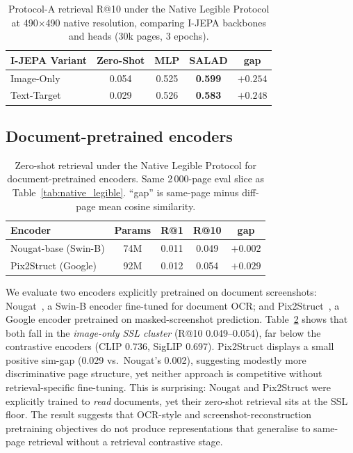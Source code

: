 \documentclass{article}
\begin{document}
\begin{table}[t]
\caption{Protocol-A retrieval R@10 under the Native Legible Protocol at 490$\times$490 native resolution, comparing I-JEPA backbones and heads (30k pages, 3 epochs).}
\label{tab:native_legible_ijepa}
\centering
\small
\begin{tabular}{lcccc}
\toprule
I-JEPA Variant & Zero-Shot & MLP & SALAD & gap \\
\midrule
\rowcolor{cSSL} Image-Only & 0.054 & 0.525 & \textbf{0.599} & $+0.254$ \\
\rowcolor{cSSL} Text-Target & 0.029 & 0.526 & \textbf{0.583} & $+0.248$ \\
\bottomrule
\end{tabular}
\end{table}

\subsection{Document-pretrained encoders}
\label{sec:doc_family}

\begin{table}[t]
\caption{Zero-shot retrieval under the Native Legible Protocol for document-pretrained encoders. Same 2\,000-page eval slice as Table~\ref{tab:native_legible}. ``gap'' is same-page minus diff-page mean cosine similarity.}
\label{tab:doc_family}
\centering
\small
\begin{tabular}{lcccc}
\toprule
Encoder & Params & R@1 & R@10 & gap \\
\midrule
\rowcolor{cSSL} Nougat-base (Swin-B) & 74M & 0.011 & 0.049 & $+0.002$ \\
\rowcolor{cSSL} Pix2Struct (Google)  & 92M & 0.012 & 0.054 & $+0.029$ \\
\bottomrule
\end{tabular}
\end{table}

We evaluate two encoders explicitly pretrained on document screenshots: Nougat~\cite{blecher2023nougat}, a Swin-B encoder fine-tuned for document OCR; and Pix2Struct~\cite{lee2023pix2struct}, a Google encoder pretrained on masked-screenshot prediction. Table~\ref{tab:doc_family} shows that both fall in the \emph{image-only SSL cluster} (R@10 0.049--0.054), far below the contrastive encoders (CLIP 0.736, SigLIP 0.697). Pix2Struct displays a small positive sim-gap (0.029 vs.\ Nougat's 0.002), suggesting modestly more discriminative page structure, yet neither approach is competitive without retrieval-specific fine-tuning. This is surprising: Nougat and Pix2Struct were explicitly trained to \emph{read} documents, yet their zero-shot retrieval sits at the SSL floor. The result suggests that OCR-style and screenshot-reconstruction pretraining objectives do not produce representations that generalise to same-page retrieval without a retrieval contrastive stage.
\end{document}
